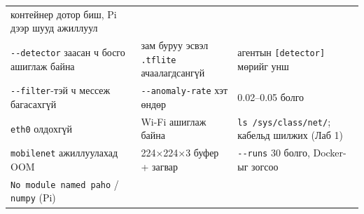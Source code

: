 \begin{longtable}[]{@{}lll@{}}
\begin{minipage}[t]{0.30\columnwidth}
контейнер дотор биш, Pi дээр шууд ажиллуул\strut
\end{minipage}\tabularnewline
\begin{minipage}[t]{0.30\columnwidth}\raggedright
\texttt{-\/-detector} заасан ч босго ашиглаж байна\strut
\end{minipage} & \begin{minipage}[t]{0.30\columnwidth}\raggedright
зам буруу эсвэл \texttt{.tflite} ачаалагдсангүй\strut
\end{minipage} & \begin{minipage}[t]{0.30\columnwidth}\raggedright
агентын \texttt{{[}detector{]}} мөрийг унш\strut
\end{minipage}\tabularnewline
\begin{minipage}[t]{0.30\columnwidth}\raggedright
\texttt{-\/-filter}-тэй ч мессеж багасахгүй\strut
\end{minipage} & \begin{minipage}[t]{0.30\columnwidth}\raggedright
\texttt{-\/-anomaly-rate} хэт өндөр\strut
\end{minipage} & \begin{minipage}[t]{0.30\columnwidth}\raggedright
0.02--0.05 болго\strut
\end{minipage}\tabularnewline
\begin{minipage}[t]{0.30\columnwidth}\raggedright
\texttt{eth0} олдохгүй\strut
\end{minipage} & \begin{minipage}[t]{0.30\columnwidth}\raggedright
Wi-Fi ашиглаж байна\strut
\end{minipage} & \begin{minipage}[t]{0.30\columnwidth}\raggedright
\texttt{ls\ /\allowbreak{}sys/\allowbreak{}class/\allowbreak{}net/\allowbreak{}}; кабельд шилжих (Лаб 1)\strut
\end{minipage}\tabularnewline
\begin{minipage}[t]{0.30\columnwidth}\raggedright
\texttt{mobilenet} ажиллуулахад OOM\strut
\end{minipage} & \begin{minipage}[t]{0.30\columnwidth}\raggedright
224×224×3 буфер + загвар\strut
\end{minipage} & \begin{minipage}[t]{0.30\columnwidth}\raggedright
\texttt{-\/-runs} 30 болго, Docker-ыг зогсоо\strut
\end{minipage}\tabularnewline
\begin{minipage}[t]{0.30\columnwidth}\raggedright
\texttt{No\ module\ named\ \textquotesingle{}paho\textquotesingle{}} / \texttt{\textquotesingle{}numpy\textquotesingle{}} (Pi)\strut

\end{minipage}
\end{longtable}
